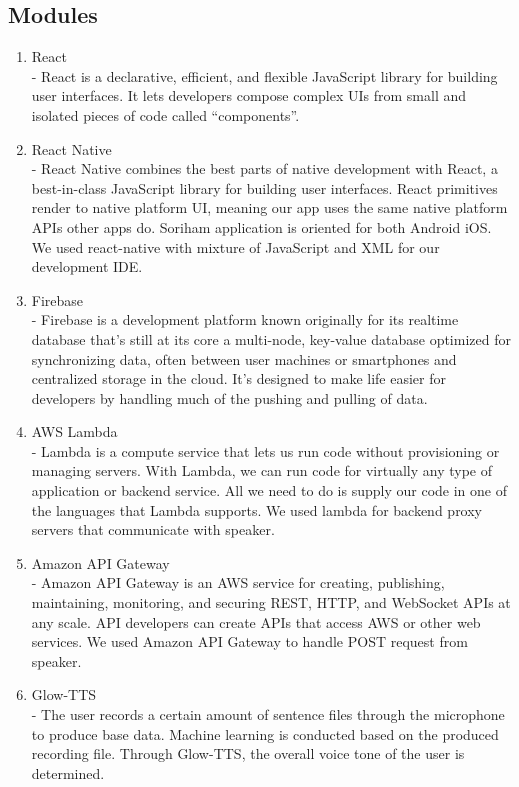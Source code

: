 \documentclass[conference]{IEEEtran}
\begin{document}
\subsection{Modules}
\begin{enumerate}
    \item React\\
    - React is a declarative, efficient, and flexible JavaScript library for building user interfaces. It lets developers compose complex UIs from small and isolated pieces of code called “components”.
    \item React Native\\
    - React Native combines the best parts of native development with React, a best-in-class JavaScript library for building user interfaces. React primitives render to native platform UI, meaning our app uses the same native platform APIs other apps do. Soriham application is oriented for both Android iOS. We used react-native with mixture of JavaScript and XML for our development IDE. 
    \item Firebase\\
    - Firebase is a development platform known originally for its realtime database that’s still at its core a multi-node, key-value database optimized for synchronizing data, often between user machines or smartphones and centralized storage in the cloud. It’s designed to make life easier for developers by handling much of the pushing and pulling of data. 
    \item AWS Lambda\\
    - Lambda is a compute service that lets us run code without provisioning or managing servers. With Lambda, we can run code for virtually any type of application or backend service. All we need to do is supply our code in one of the languages that Lambda supports. We used lambda for backend proxy servers that communicate with speaker.
    \item Amazon API Gateway\\
    - Amazon API Gateway is an AWS service for creating, publishing, maintaining, monitoring, and securing REST, HTTP, and WebSocket APIs at any scale. API developers can create APIs that access AWS or other web services. We used Amazon API Gateway to handle POST request from speaker.
    \item Glow-TTS\\
    - The user records a certain amount of sentence files through the microphone to produce base data. Machine learning is conducted based on the produced recording file. Through Glow-TTS, the overall voice tone of the user is determined.

\end{enumerate}
\end{document}
